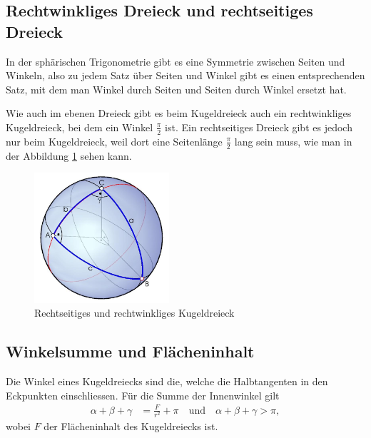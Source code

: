 \subsection{Rechtwinkliges Dreieck und rechtseitiges Dreieck}
In der sphärischen Trigonometrie gibt es eine Symmetrie zwischen Seiten und Winkeln, also zu jedem Satz über Seiten und Winkel gibt es einen entsprechenden Satz, mit dem man Winkel durch Seiten und Seiten durch Winkel ersetzt hat.

Wie auch im ebenen Dreieck gibt es beim Kugeldreieck auch ein rechtwinkliges Kugeldreieck, bei dem ein Winkel $\frac{\pi}{2}$ ist. 
Ein rechtseitiges Dreieck gibt es jedoch nur beim Kugeldreieck, weil dort eine Seitenlänge $\frac{\pi}{2}$ lang sein muss, wie man in der Abbildung \ref{recht} sehen kann.

\begin{figure}
	
	\begin{center}
		\includegraphics[width=5cm]{papers/nav/bilder/recht.jpg}
		\caption[Rechtseitiges und rechtwinkliges Kugeldreieck]{Rechtseitiges und rechtwinkliges Kugeldreieck}
		\label{recht}
	\end{center}	
\end{figure}

\subsection{Winkelsumme und Flächeninhalt}
\label{trigo}
%
	


Die Winkel eines Kugeldreiecks sind die, welche die Halbtangenten in den Eckpunkten einschliessen. 
Für die Summe der Innenwinkel gilt
\begin{align}
	\alpha+\beta+\gamma &= \frac{F}{r^2} + \pi \quad \text{und} \quad \alpha+\beta+\gamma > \pi, \nonumber
\end{align}
wobei $F$ der Flächeninhalt des Kugeldreiecks ist.
